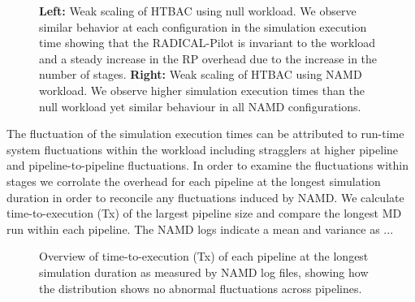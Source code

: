 \begin{figure}[!htbp]
  \centering
  \begin{minipage}[b]{0.55\textwidth}
  \centering
  \end{minipage}
  \begin{minipage}[b]{0.44\textwidth}
  \centering
  \end{minipage}

\caption{\textbf{Left:} Weak scaling of HTBAC using null workload. We observe similar behavior at each 	
configuration in the simulation execution time showing that the RADICAL-Pilot is invariant to the
workload and a steady increase in the RP overhead due to the increase in the number of stages. 
\textbf{Right:} Weak scaling of HTBAC using NAMD workload. We observe higher simulation execution times than the null workload yet similar behaviour in all NAMD configurations.}
\label{fig:htbac_perf}
\end{figure}


The fluctuation of the simulation execution times can be attributed to run-time system fluctuations within the workload including stragglers at higher pipeline and pipeline-to-pipeline fluctuations. In order to examine the fluctuations within stages we corrolate the overhead for each pipeline at the longest simulation duration in order to reconcile any fluctuations induced by NAMD. We calculate time-to-execution (Tx) of the largest pipeline size and compare the longest MD run within each pipeline. The NAMD logs indicate a mean and variance as ...

\begin{figure}[!htbp]
  \centering
  \begin{minipage}[b]{0.55\textwidth}
  \centering
  \end{minipage}
  \begin{minipage}[b]{0.44\textwidth}
  \centering
  \end{minipage}
\caption{Overview of time-to-execution (Tx) of each pipeline at the longest simulation duration as measured by NAMD log files, showing how the distribution shows no abnormal fluctuations across pipelines.}
\label{fig:namd_logs}
\end{figure}

